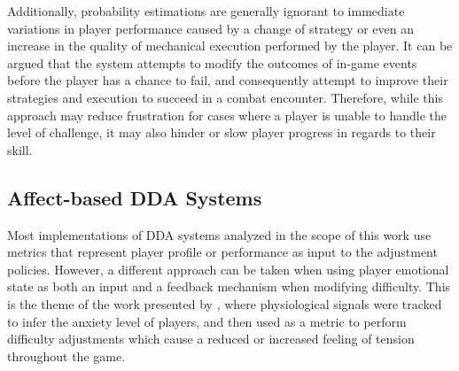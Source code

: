 Additionally, probability estimations are generally ignorant to immediate variations in player performance caused by a change of strategy or even an increase in the quality of mechanical execution performed by the player. It can be argued that the system attempts to modify the outcomes of in-game events before the player has a chance to fail, and consequently attempt to improve their strategies and execution to succeed in a combat encounter. Therefore, while this approach may reduce frustration for cases where a player is unable to handle the level of challenge, it may also hinder or slow player progress in regards to their skill.


\subsection{Affect-based DDA Systems}




Most implementations of DDA systems analyzed in the scope of this work use metrics that represent player profile or performance as input to the adjustment policies. However, a different approach can be taken when using player emotional state as both an input and a feedback mechanism when modifying difficulty. This is the theme of the work presented by \citet{article_affectivedda}, where physiological signals were tracked to infer the anxiety level of players, and then used as a metric to perform difficulty adjustments which cause a reduced or increased feeling of tension throughout the game.

